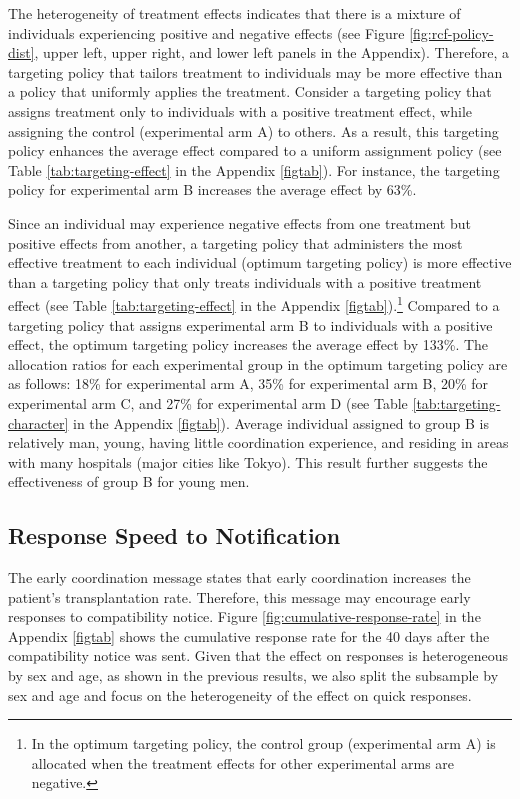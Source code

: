 \documentclass[12pt, a4paper]{article}
\begin{document}
The heterogeneity of treatment effects indicates that there is a mixture of individuals experiencing positive and negative effects (see Figure \ref{fig:rcf-policy-dist}, upper left, upper right, and lower left panels in the Appendix). Therefore, a targeting policy that tailors treatment to individuals may be more effective than a policy that uniformly applies the treatment. Consider a targeting policy that assigns treatment only to individuals with a positive treatment effect, while assigning the control (experimental arm A) to others. As a result, this targeting policy enhances the average effect compared to a uniform assignment policy (see Table \ref{tab:targeting-effect} in the Appendix \ref{figtab}). For instance, the targeting policy for experimental arm B increases the average effect by 63\%.

Since an individual may experience negative effects from one treatment but positive effects from another, a targeting policy that administers the most effective treatment to each individual (optimum targeting policy) is more effective than a targeting policy that only treats individuals with a positive treatment effect (see Table \ref{tab:targeting-effect} in the Appendix \ref{figtab}).\footnote{In the optimum targeting policy, the control group (experimental arm A) is allocated when the treatment effects for other experimental arms are negative.} Compared to a targeting policy that assigns experimental arm B to individuals with a positive effect, the optimum targeting policy increases the average effect by 133\%. The allocation ratios for each experimental group in the optimum targeting policy are as follows: 18\% for experimental arm A, 35\% for experimental arm B, 20\% for experimental arm C, and 27\% for experimental arm D (see Table \ref{tab:targeting-character} in the Appendix \ref{figtab}). Average individual assigned to group B is relatively man, young, having little coordination experience, and residing in areas with many hospitals (major cities like Tokyo). This result further suggests the effectiveness of group B for young men.

\hypertarget{reply-speed}{%
\subsection{Response Speed to Notification}\label{reply-speed}}

The early coordination message states that early coordination increases the patient's transplantation rate. Therefore, this message may encourage early responses to compatibility notice. Figure \ref{fig:cumulative-response-rate} in the Appendix \ref{figtab} shows the cumulative response rate for the 40 days after the compatibility notice was sent. Given that the effect on responses is heterogeneous by sex and age, as shown in the previous results, we also split the subsample by sex and age and focus on the heterogeneity of the effect on quick responses.
\end{document}
